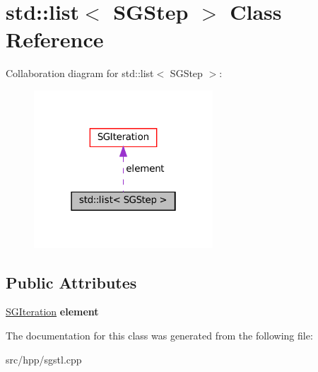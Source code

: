 \hypertarget{classstd_1_1list_3_01SGStep_01_4}{}\section{std\+:\+:list$<$ S\+G\+Step $>$ Class Reference}
\label{classstd_1_1list_3_01SGStep_01_4}


Collaboration diagram for std\+:\+:list$<$ S\+G\+Step $>$\+:
\nopagebreak
\begin{figure}[H]
\begin{center}
\leavevmode
\includegraphics[width=190pt]{classstd_1_1list_3_01SGStep_01_4__coll__graph}
\end{center}
\end{figure}
\subsection*{Public Attributes}
\begin{DoxyCompactItemize}
\item 
\mbox{\label{classstd_1_1list_3_01SGStep_01_4_a918e6d638b82e9344f4aa20c83ff8f7a}} 
\hyperlink{classSGIteration}{S\+G\+Iteration} {\bfseries element}
\end{DoxyCompactItemize}


The documentation for this class was generated from the following file\+:\begin{DoxyCompactItemize}
\item 
src/hpp/sgstl.\+cpp\end{DoxyCompactItemize}

